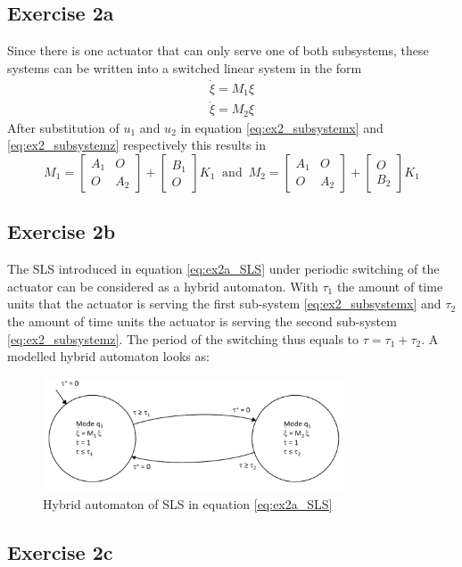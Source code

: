 \subsection{Exercise 2a}
Since there is one actuator that can only serve one of both subsystems, these systems can be written into a switched linear system in the form
\begin{equation}
    \begin{matrix}
    \dot{\xi} = M_1 \xi \\
    \dot{\xi} = M_2 \xi
    \end{matrix}
    \label{eq:ex2a_SLS}
\end{equation}
After substitution of $u_1$ and $u_2$ in equation \ref{eq:ex2_subsystemx} and \ref{eq:ex2_subsystemz} respectively this results in
\begin{equation*}
    M_1 = \begin{bmatrix}
    A_1 & O \\ O & A_2 \end{bmatrix} + \begin{bmatrix} B_1 \\ O \end{bmatrix}K_1 \; \; \text{and} \; \: M_2 = \begin{bmatrix}
    A_1 & O \\ O & A_2 \end{bmatrix} + \begin{bmatrix} O \\ B_2 \end{bmatrix}K_1
\end{equation*}

\subsection{Exercise 2b}
The SLS introduced in equation \eqref{eq:ex2a_SLS} under periodic switching of the actuator can be considered as a hybrid automaton. With $\tau_1$ the amount of time units that the actuator is serving the first sub-system \eqref{eq:ex2_subsystemx} and $\tau_2$ the amount of time units the actuator is serving the second sub-system \eqref{eq:ex2_subsystemz}. The period of the switching thus equals to $\tau = \tau_1 + \tau_2$. A modelled hybrid automaton looks as:

\begin{figure}[H]
    \centering
    \includegraphics[width=0.8\textwidth]{Images/ex2b_hybridautomaton.PNG}
    \caption{Hybrid automaton of SLS in equation \eqref{eq:ex2a_SLS}}
    \label{fig:ex2b_hybridautomaton}
\end{figure}

\subsection{Exercise 2c}


